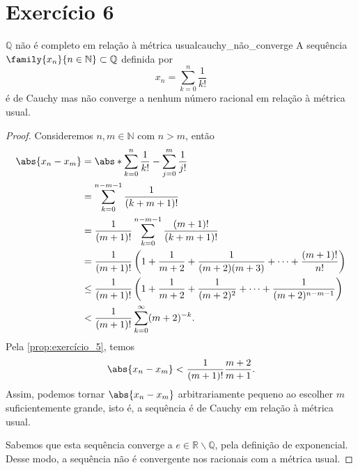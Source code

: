 \section*{Exercício 6}
\begin{proposition}{\(\mathbb{Q}\) não é completo em relação à métrica usual}{cauchy_não_converge}
    A sequência \(\family{x_n}{n\in \mathbb{N}}\subset \mathbb{Q}\) definida por
    \begin{equation*}
        x_n = \sum_{k = 0}^n \frac{1}{k!}
    \end{equation*}
    é de Cauchy mas não converge a nenhum número racional em relação à métrica usual.
\end{proposition}
\begin{proof}
    Consideremos \(n,m \in \mathbb{N}\) com \(n > m\), então
    \begin{align*}
        \abs{x_n - x_m} &= \abs*{\sum_{k=0}^{n}\frac{1}{k!} - \sum_{j = 0}^m\frac{1}{j!}}\\
                        &= \sum_{k=0}^{n-m-1} \frac{1}{(k+m+1)!}\\
                        &= \frac{1}{(m+1)!} \sum_{k=0}^{n-m-1} \frac{(m+1)!}{(k+m+1)!}\\
                        &= \frac{1}{(m+1)!} \left(1 + \frac{1}{m+2} + \frac{1}{(m+2)(m+3)} + \dots + \frac{(m+1)!}{n!}\right)\\
                        &\leq \frac{1}{(m+1)!}\left(1 + \frac{1}{m+2} + \frac{1}{(m+2)^2} + \dots + \frac{1}{(m+2)^{n-m-1}}\right)\\
                        &<\frac{1}{(m+1)!} \sum_{k = 0}^\infty (m+2)^{-k}.
    \end{align*}
    Pela \cref{prop:exercício_5}, temos
    \begin{equation*}
        \abs{x_n - x_m} < \frac{1}{(m+1)!}\frac{m + 2}{m + 1}.
    \end{equation*}
    Assim, podemos tornar \(\abs{x_n - x_m}\) arbitrariamente pequeno ao escolher \(m\) suficientemente grande, isto é, a sequência é de Cauchy em relação à métrica usual.

    Sabemos que esta sequência converge a \(e \in \mathbb{R} \smallsetminus \mathbb{Q}\), pela definição de exponencial. Desse modo, a sequência não é convergente nos racionais com a métrica usual.
\end{proof}
